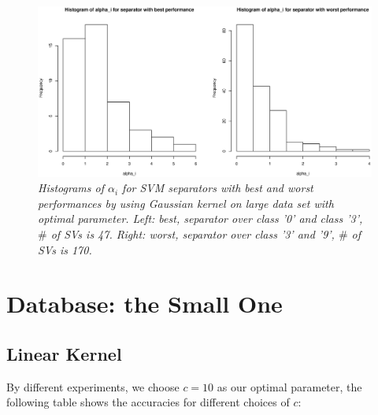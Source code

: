 \documentclass{article}
\begin{document}
\begin{figure}[htp]
\centering
\includegraphics[width=12.1cm]{large_hist_gaussian.eps}
\caption{\textit{Histograms of $\alpha_{i}$ for SVM separators with best and worst performances by using Gaussian kernel on large data set with optimal parameter. Left: best, separator over class '0' and class '3', $\#$ of SVs is 47. Right: worst, separator over class '3' and '9', $\#$ of SVs is 170.}}
\end{figure}

\goodbreak

\newpage

\section{Database: the Small One}

\subsection{Linear Kernel}

By different experiments, we choose $c=10$ as our optimal parameter, the following table shows the accuracies for different choices of $c$:  

  
\end{document}
